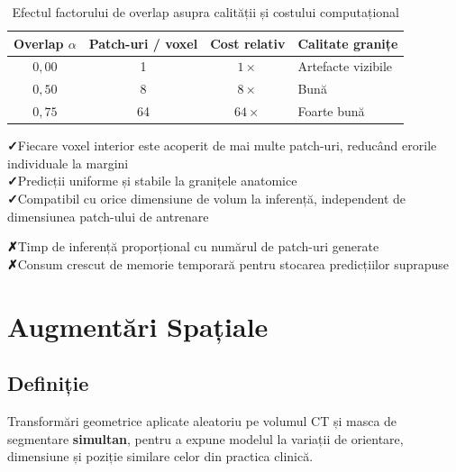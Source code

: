 \documentclass[12pt, a4paper]{report}
\newcommand{\pro}{\textcolor{accentgreen}{\textbf{✓}}\;}
\newcommand{\con}{\textcolor{accentred}{\textbf{✗}}\;}
\begin{document}
\begin{table}[H]
    \centering
    \caption{Efectul factorului de overlap asupra calității și costului
             computațional}
    \label{tab:overlap_tradeoff}
    \begin{tabular}{cccl}
        \toprule
        \textbf{Overlap $\alpha$} &
        \textbf{Patch-uri / voxel} &
        \textbf{Cost relativ} &
        \textbf{Calitate granițe} \\
        \midrule
        $0{,}00$ & 1   & $1\times$  & Artefacte vizibile \\
        $0{,}50$ & 8   & $8\times$  & Bună \\
        $0{,}75$ & 64  & $64\times$ & Foarte bună \\
        \bottomrule
    \end{tabular}
\end{table}

\vspace{6pt}
\begin{goodbox}
\pro Fiecare voxel interior este acoperit de mai multe patch-uri,
     reducând erorile individuale la margini \\
\pro Predicții uniforme și stabile la granițele anatomice \\
\pro Compatibil cu orice dimensiune de volum la inferență,
     independent de dimensiunea patch-ului de antrenare
\end{goodbox}

\begin{badbox}
\con Timp de inferență proporțional cu numărul de patch-uri generate \\
\con Consum crescut de memorie temporară pentru stocarea
     predicțiilor suprapuse
\end{badbox}



\section{Augmentări Spațiale}
\label{sec:aug_spatiale}

\subsection{Definiție}

\vspace{4pt}
\begin{infobox}
Transformări geometrice aplicate aleatoriu pe volumul CT și masca
de segmentare \textbf{simultan}, pentru a expune modelul la variații
de orientare, dimensiune și poziție similare celor din practica clinică.
\end{infobox}
\end{document}

